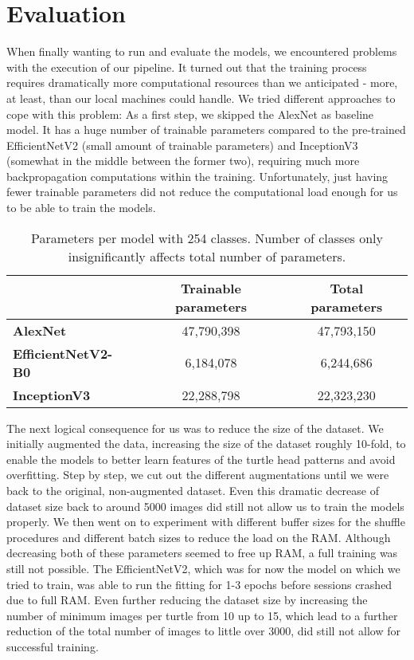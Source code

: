 \section{Evaluation}


When finally wanting to run and evaluate the models, we encountered problems with the execution of our pipeline. It turned out that the training process requires dramatically more computational resources than we anticipated - more, at least, than our local machines could handle. We tried different approaches to cope with this problem: As a first step, we skipped the AlexNet as baseline model. It has a huge number of trainable parameters compared to the pre-trained EfficientNetV2 (small amount of trainable parameters) and InceptionV3 (somewhat in the middle between the former two), requiring much more backpropagation computations within the training. Unfortunately, just having fewer trainable parameters did not reduce the computational load enough for us to be able to train the models.

\begin{table}[h]
    \centering
    \begin{tabular}{l|c|c|}
    \cline{2-3}
                                                     & Trainable parameters & Total parameters \\ \hline
    \multicolumn{1}{|l|}{\textbf{AlexNet}}           & 47,790,398           & 47,793,150       \\ \hline
    \multicolumn{1}{|l|}{\textbf{EfficientNetV2-B0}} & 6,184,078            & 6,244,686        \\ \hline
    \multicolumn{1}{|l|}{\textbf{InceptionV3}}       & 22,288,798           & 22,323,230       \\ \hline
    \end{tabular}
    \caption{Parameters per model with 254 classes. Number of classes only insignificantly affects total number of parameters.}
    \label{tab:paramsPerModel}
\end{table}

The next logical consequence for us was to reduce the size of the dataset. We initially augmented the data, increasing the size of the dataset roughly 10-fold, to enable the models to better learn features of the turtle head patterns and avoid overfitting. Step by step, we cut out the different augmentations until we were back to the original, non-augmented dataset. Even this dramatic decrease of dataset size back to around 5000 images did still not allow us to train the models properly. We then went on to experiment with different buffer sizes for the shuffle procedures and different batch sizes to reduce the load on the RAM. Although decreasing both of these parameters seemed to free up RAM, a full training was still not possible. The EfficientNetV2, which was for now the model on which we tried to train, was able to run the fitting for 1-3 epochs before sessions crashed due to full RAM. Even further reducing the dataset size by increasing the number of minimum images per turtle from 10 up to 15, which lead to a further reduction of the total number of images to little over 3000, did still not allow for successful training.

